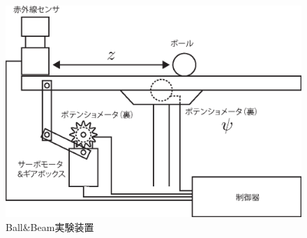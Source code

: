 \documentclass[a4paper,10.5pt]{ltjsarticle}
\begin{document}
\begin{figure}[h]
  \centering
  \includegraphics[scale=0.7]{figure1.eps}
  \caption{Ball\&Beam実験装置}
  \label{fig:figure1}
\end{figure}
\end{document}
